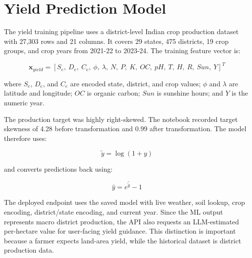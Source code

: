 \documentclass[12pt,a4paper]{report}
\begin{document}
\section{Yield Prediction Model}

The yield training pipeline uses a district-level Indian crop production dataset with 27,303 rows and 21 columns. It covers 29 states, 475 districts, 19 crop groups, and crop years from 2021-22 to 2023-24. The training feature vector is:

\begin{equation}
\mathbf{x}_{yield} =
[S_e,\ D_e,\ C_e,\ \phi,\ \lambda,\ N,\ P,\ K,\ OC,\ pH,\ T,\ H,\ R,\ Sun,\ Y]^T
\end{equation}

where $S_e$, $D_e$, and $C_e$ are encoded state, district, and crop values; $\phi$ and $\lambda$ are latitude and longitude; $OC$ is organic carbon; $Sun$ is sunshine hours; and $Y$ is the numeric year.

The production target was highly right-skewed. The notebook recorded target skewness of 4.28 before transformation and 0.99 after transformation. The model therefore uses:

\begin{equation}
\tilde{y} = \log(1 + y)
\end{equation}

and converts predictions back using:

\begin{equation}
\hat{y} = e^{\hat{\tilde{y}}} - 1
\end{equation}

The deployed endpoint uses the saved model with live weather, soil lookup, crop encoding, district/state encoding, and current year. Since the ML output represents macro district production, the API also requests an LLM-estimated per-hectare value for user-facing yield guidance. This distinction is important because a farmer expects land-area yield, while the historical dataset is district production data.
\end{document}
